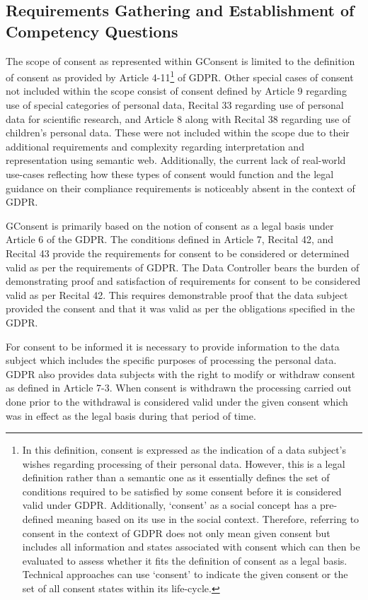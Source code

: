 \subsection{Requirements Gathering and Establishment of Competency Questions}
The scope of consent as represented within GConsent is limited to the definition of consent as provided by Article 4-11\footnote{In this definition, consent is expressed as the indication of a data subject's wishes regarding processing of their personal data. However, this is a legal definition rather than a semantic one as it essentially defines the set of conditions required to be satisfied by some consent before it is considered valid under GDPR. Additionally, `consent' as a social concept has a pre-defined meaning based on its use in the social context. Therefore, referring to consent in the context of GDPR does not only mean given consent but includes all information and states associated with consent which can then be evaluated to assess whether it fits the definition of consent as a legal basis. Technical approaches can use `consent' to indicate the given consent or the set of all consent states within its life-cycle.} of GDPR. 
Other special cases of consent not included within the scope consist of consent defined by Article 9 regarding use of special categories of personal data, Recital 33 regarding use of personal data for scientific research, and Article 8 along with Recital 38 regarding use of children’s personal data.
These were not included within the scope due to their additional requirements and complexity regarding interpretation and representation using semantic web. Additionally, the current lack of real-world use-cases reflecting how these types of consent would function and the legal guidance on their compliance requirements is noticeably absent in the context of GDPR.

GConsent is primarily based on the notion of consent as a legal basis under Article 6 of the GDPR. The conditions defined in Article 7, Recital 42, and Recital 43 provide the requirements for consent to be considered or determined valid as per the requirements of GDPR.
The Data Controller bears the burden of demonstrating proof and satisfaction of requirements for consent to be considered valid as per Recital 42. This requires demonstrable proof that the data subject provided the consent and that it was valid as per the obligations specified in the GDPR.

For consent to be informed it is necessary to provide information to the data subject which includes the specific purposes of processing the personal data.
GDPR also provides data subjects with the right to modify or withdraw consent as defined in Article 7-3.
When consent is withdrawn the processing carried out done prior to the withdrawal is considered valid under the given consent which was in effect as the legal basis during that period of time.

